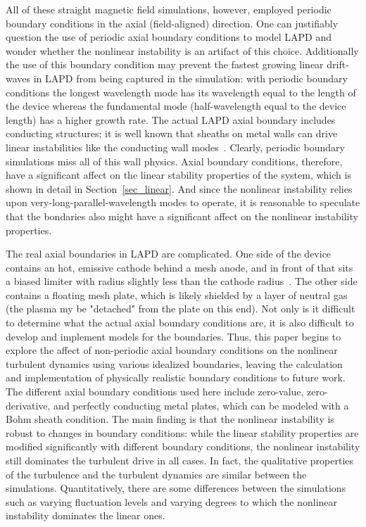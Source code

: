 \documentclass[showpacs,preprintnumbers,amsmath,amssymb,superscriptaddress,aip]{revtex4-1}
\begin{document}
All of these straight magnetic field simulations, however, employed periodic boundary conditions in the axial (field-aligned) direction.   One can justifiably question the use of periodic axial boundary conditions to model LAPD and wonder whether the nonlinear instability is an artifact of this choice.  Additionally the use of this boundary condition may prevent the fastest growing linear drift-waves in LAPD from being captured in the simulation: with periodic boundary conditions the longest wavelength mode has its wavelength equal to the length of the device whereas the fundamental mode (half-wavelength equal to the device length) has a higher growth rate.  The actual LAPD axial boundary includes conducting structures; it is well known that sheaths on metal walls can drive linear instabilities like the conducting wall modes~\cite{berk1991}. Clearly, periodic boundary simulations miss all of this wall physics.
Axial boundary conditions, therefore, have a significant
affect on the linear stability properties of the system, which is shown in detail in Section~\ref{sec_linear}. And since the nonlinear instability relies upon very-long-parallel-wavelength modes to operate, it is 
reasonable to speculate that the bondaries also might have a significant affect on the nonlinear instability properties.

The real axial boundaries in LAPD are complicated. One side of the device contains an hot, emissive cathode behind a mesh anode, and in front of that sits a biased limiter with radius slightly
less than the cathode radius~\cite{schaffner2012}.
The other side contains a floating mesh plate, which is likely shielded by a layer of neutral gas (the plasma my be "detached" from the plate on this end). Not only is it difficult to determine what the actual axial boundary conditions are, it is also
difficult to develop and implement models for the boundaries. Thus, this paper begins to explore the affect of non-periodic axial boundary conditions on the nonlinear turbulent dynamics using various
idealized boundaries, leaving the calculation and implementation of physically realistic boundary conditions to future work. 
The different axial boundary conditions used here include zero-value, zero-derivative, and perfectly conducting metal plates, which can be modeled with a Bohm sheath condition. 
The main finding is that the nonlinear instability is robust to changes in boundary conditions:  while the linear stability properties are modified significantly with different boundary conditions,  the 
nonlinear instability still dominates the turbulent drive in all cases. 
In fact, the qualitative properties of the turbulence and the turbulent
dynamics are similar between the simulations. Quantitatively, there are some differences between the simulations such as varying fluctuation levels and varying degrees to which
the nonlinear instability dominates the linear ones.
\end{document}
